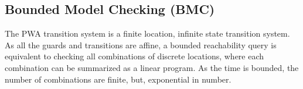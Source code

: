 % 


% 
% 
% 
\subsection{Bounded Model Checking (BMC)}
The PWA transition system is a finite location, infinite state
transition system. As all the guards and transitions are affine, a
bounded reachability query is equivalent to checking all
combinations of discrete locations, where each combination can be
summarized as a linear program. As the time is bounded, the number of
combinations are finite, but, exponential in number.

